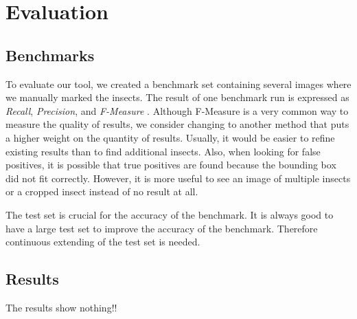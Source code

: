 %
\section{Evaluation}
\label{sec_eval}

\subsection{Benchmarks}
To evaluate our tool, we created a benchmark set containing several images where we manually marked the insects.
The result of one benchmark run is expressed as \textit{Recall}, \textit{Precision}, and \textit{F-Measure} \cite{f_measure}.
Although F-Measure is a very common way to measure the quality of results, we consider changing  to another method that puts a higher weight on the quantity of results. 
Usually, it would be easier to refine existing results than to find additional insects. 
Also, when looking for false positives, it is possible that true positives are found because the bounding box did not fit correctly.
However, it is more useful to see an image of multiple insects or a cropped insect instead of no result at all.

The test set is crucial for the accuracy of the benchmark. 
It is always good to have a large test set to improve the accuracy of the benchmark.
Therefore continuous extending of the test set is needed. 

\subsection{Results}

The results show nothing!!